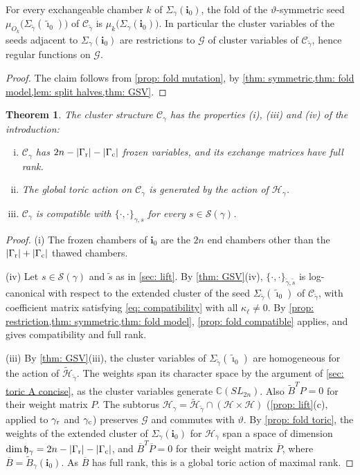 \documentclass[a4paper]{amsart}
\numberwithin{equation}{section}
\newtheorem{theorem}{Theorem}[section]
\theoremstyle{definition}
\theoremstyle{remark}
\newcommand{\bbC}{\mathbb{C}}
\newcommand{\mfh}{\mathfrak{h}}
\newcommand{\mcG}{\mathcal{G}}
\newcommand{\mcH}{\mathcal{H}}
\newcommand{\mcC}{\mathcal{C}}
\newcommand{\mcS}{\mathcal{S}}
\newcommand{\bfi}{\mathbf{i}}
\newcommand{\tbfi}{\widetilde{\boldsymbol{\imath}}}
\newcommand{\tB}{\widetilde{B}}
\newcommand{\tg}{\widetilde{\gamma}}
\newcommand{\vt}{\vartheta}
\newcommand{\rr}{{\rm r}}
\newcommand{\cc}{{\rm c}}
\newcommand{\SL}{SL_{2n}}
\begin{document}
\begin{proposition}
  \label{prop: adjacent}
  For every exchangeable chamber $k$ of $\Sigma_\gamma(\bfi_0)$, the fold of the $\vt$-symmetric seed $\mu_{O_k}\big(\Sigma_{\tg}(\tbfi_0)\big)$ of $\mcC_{\tg}$ is $\mu_k\big(\Sigma_\gamma(\bfi_0)\big)$.
  In particular the cluster variables of the seeds adjacent to $\Sigma_\gamma(\bfi_0)$ are restrictions to $\mcG$ of cluster variables of $\mcC_{\tg}$, hence regular functions on $\mcG$.
\end{proposition}
\begin{proof}
  The claim follows from \cref{prop: fold mutation}, by \cref{thm: symmetric,thm: fold model,lem: split halves,thm: GSV}.
\end{proof}

\begin{theorem}
  \label{thm: structure}
  The cluster structure $\mcC_\gamma$ has the properties (i), (iii) and (iv) of the introduction:
  \begin{enumerate}[(i)]
    \item $\mcC_\gamma$ has $2n-|\Gamma_{\rr}|-|\Gamma_{\cc}|$ frozen variables, and its exchange matrices have full rank.
    \setcounter{enumi}{2}
    \item The global toric action on $\mcC_\gamma$ is generated by the action of $\mcH_\gamma$.
    \item $\mcC_\gamma$ is compatible with $\{\cdot,\cdot\}_{\gamma,s}$ for every $s\in\mcS(\gamma)$.
  \end{enumerate}
\end{theorem}
\begin{proof}
  (i) The frozen chambers of $\bfi_0$ are the $2n$ end chambers other than the $|\Gamma_{\rr}|+|\Gamma_{\cc}|$ thawed chambers.

  (iv) Let $s\in\mcS(\gamma)$ and $\widetilde{s}$ as in \cref{sec: lift}.
  By \cref{thm: GSV}(iv), $\{\cdot,\cdot\}_{\tg,\widetilde{s}}$ is log-canonical with respect to the extended cluster of the seed $\Sigma_{\tg}(\tbfi_0)$ of $\mcC_{\tg}$, with coefficient matrix satisfying \eqref{eq: compatibility} with all $\kappa_\ell\neq0$.
  By \cref{prop: restriction,thm: symmetric,thm: fold model}, \cref{prop: fold compatible} applies, and gives compatibility and full rank.

  (iii) By \cref{thm: GSV}(iii), the cluster variables of $\Sigma_{\tg}(\tbfi_0)$ are homogeneous for the action of $\widetilde{\mcH}_{\tg}$.
  The weights span its character space by the argument of \cref{sec: toric A concise}, as the cluster variables generate $\bbC(\SL)$.
  Also $\tB^TP=0$ for their weight matrix $P$.
  The subtorus $\mcH_\gamma=\widetilde{\mcH}_{\tg}\cap(\mcH\times\mcH)$ (\cref{prop: lift}(c), applied to $\gamma_{\rr}$ and $\gamma_{\cc}$) preserves $\mcG$ and commutes with $\vt$. By \cref{prop: fold toric}, the weights of the extended cluster of $\Sigma_\gamma(\bfi_0)$ for $\mcH_\gamma$ span a space of dimension $\dim\mfh_\gamma=2n-|\Gamma_{\rr}|-|\Gamma_{\cc}|$, and $\overline{B}^T\overline{P}=0$ for their weight matrix $\overline{P}$, where $\overline{B}=\tB_\gamma(\bfi_0)$.
  As $\overline{B}$ has full rank, this is a global toric action of maximal rank.
\end{proof}
\end{document}
